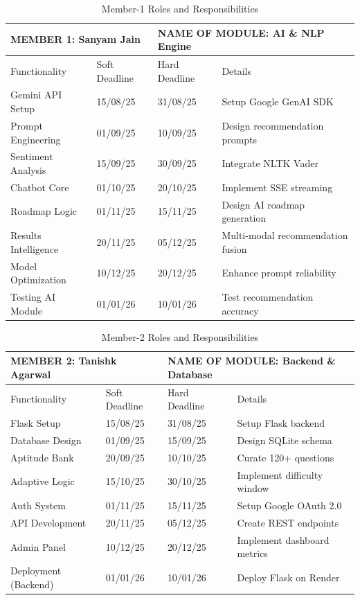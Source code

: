 \begin{table}[H]
\centering
\caption{Member-1 Roles and Responsibilities}
\begin{tabular}{|p{4cm}|p{2.5cm}|p{2.5cm}|p{5cm}|}
\hline
\multicolumn{2}{|l|}{MEMBER 1: Sanyam Jain} &
\multicolumn{2}{|l|}{NAME OF MODULE: AI \& NLP Engine} \\
\hline
Functionality & Soft Deadline & Hard Deadline & Details \\
\hline
Gemini API Setup & 15/08/25 & 31/08/25 & Setup Google GenAI SDK \\
\hline
Prompt Engineering & 01/09/25 & 10/09/25 & Design recommendation prompts \\
\hline
Sentiment Analysis & 15/09/25 & 30/09/25 & Integrate NLTK Vader \\
\hline
Chatbot Core & 01/10/25 & 20/10/25 & Implement SSE streaming \\
\hline
Roadmap Logic & 01/11/25 & 15/11/25 & Design AI roadmap generation \\
\hline
Results Intelligence & 20/11/25 & 05/12/25 & Multi-modal recommendation fusion \\
\hline
Model Optimization & 10/12/25 & 20/12/25 & Enhance prompt reliability \\
\hline
Testing AI Module & 01/01/26 & 10/01/26 & Test recommendation accuracy \\
\hline
\end{tabular}

\end{table}

\begin{table}[H]
\centering
\caption{Member-2 Roles and Responsibilities}
\begin{tabular}{|p{4cm}|p{2.5cm}|p{2.5cm}|p{5cm}|}
\hline
\multicolumn{2}{|l|}{MEMBER 2: Tanishk Agarwal} &
\multicolumn{2}{|l|}{NAME OF MODULE: Backend \& Database} \\
\hline
Functionality & Soft Deadline & Hard Deadline & Details \\
\hline
Flask Setup & 15/08/25 & 31/08/25 & Setup Flask backend \\
\hline
Database Design & 01/09/25 & 15/09/25 & Design SQLite schema \\
\hline
Aptitude Bank & 20/09/25 & 10/10/25 & Curate 120+ questions \\
\hline
Adaptive Logic & 15/10/25 & 30/10/25 & Implement difficulty window \\
\hline
Auth System & 01/11/25 & 15/11/25 & Setup Google OAuth 2.0 \\
\hline
API Development & 20/11/25 & 05/12/25 & Create REST endpoints \\
\hline
Admin Panel & 10/12/25 & 20/12/25 & Implement dashboard metrics \\
\hline
Deployment (Backend) & 01/01/26 & 10/01/26 & Deploy Flask on Render \\
\hline
\end{tabular}

\end{table}

